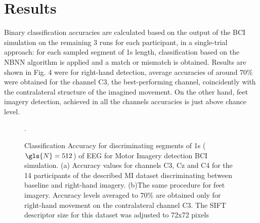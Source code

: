 \section{Results}

Binary classification accuracies are calculated based on the output of the BCI simulation on the remaining 3 runs for each participant, in a single-trial approach: for each sampled segment of 1s length, classification based on the NBNN algorithm is applied and a match or mismatch is obtained.  Results are shown in Fig. 4 were for right-hand detection, average accuracies of around $70\%$ were obtained for the channel C3, the best-performing channel, coincidently with the contralateral structure of the imagined movement.  On the other hand, feet imagery detection, achieved in all the channels accuracies is just above chance level.

   
\begin{figure}[h!]
\centering
{}
\caption[Motor Imagery Accuracy]{Classification Accuracy for discriminating segments of 1s ($\gls{N} = 512$) of EEG for Motor Imagery detection BCI simulation. (a) Accuracy values for channels C3, Cz and C4 for the 14 participants of the described MI dataset discriminating between baseline and right-hand imagery. (b)The same procedure for feet imagery. Accuracy levels averaged to $70\%$ are obtained only for right-hand movement on the contralateral channel C3. The SIFT descriptor size for this dataset was adjusted to 72x72 pixels}.
\label{fig:miresults}
\end{figure}
   
